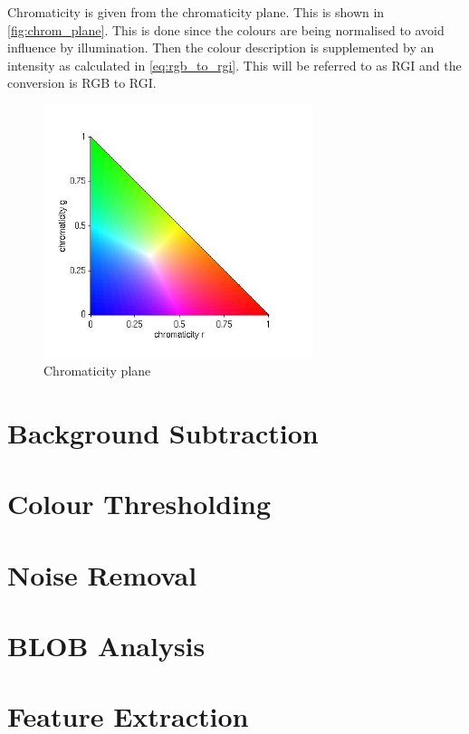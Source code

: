 Chromaticity is given from the chromaticity plane. This is shown in \autoref{fig:chrom_plane}. This is done since the colours are being normalised to avoid influence by illumination. Then the colour description is supplemented by an intensity as calculated in \autoref{eq:rgb_to_rgi}. This will be referred to as RGI and the conversion is RGB to RGI.


\begin{figure}[H]
	\centering
	\includegraphics[width=0.7\textwidth]{figures/chrom_plane}
	\caption{Chromaticity plane}
	\label{fig:chrom_plane}
\end{figure}

\section{Background Subtraction}

\section{Colour Thresholding}

\section{Noise Removal}

\section{BLOB Analysis}

\section{Feature Extraction}
